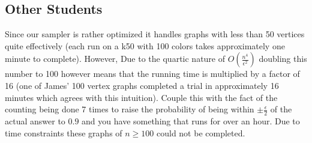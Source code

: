 \documentclass[14]{article}
\begin{document}
\subsection{Other Students}
Since our sampler is rather optimized it handles graphs with less than 50 vertices quite effectively (each run on a k50 with 100 colors takes approximately one minute to complete). However, Due to the quartic nature of $O(\frac{n^4}{\epsilon^2})$ doubling this number to 100 however means that the running time is multiplied by a factor of 16 (one of James' 100 vertex graphs completed a trial in approximately 16 minutes which agrees with this intuition). Couple this with the fact of the counting being done 7 times to raise the probability of being within $\pm \frac{\epsilon}{2}$ of the actual answer to $0.9$ and you have something that runs for over an hour. Due to time constraints these graphs of $n \geq 100$ could not be completed.
\end{document}
